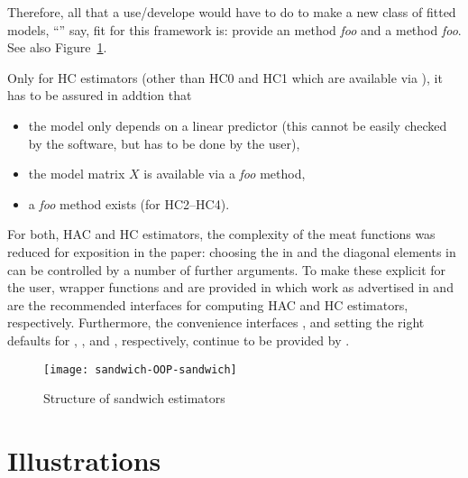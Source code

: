 \documentclass{Z}
\begin{document}
Therefore, all that a use/develope would have to do to make a
new class of fitted models, ``'' say, fit for this framework is: 
provide an  method \emph{foo}\code{()}
and a  method \emph{foo}\code{()}. See also Figure~\ref{fig:sandwich}.

Only for HC estimators (other than HC0 and HC1 which are available via ),
it has to be assured in addtion that 
\begin{itemize}
  \item the model only depends on a linear predictor (this cannot be easily
        checked by the software, but has to be done by the user),
  \item the model matrix $X$ is available via a \emph{foo}\code{()} method,
  \item a \emph{foo}\code{()} method exists (for HC2--HC4).
\end{itemize}

For both, HAC and HC estimators, the complexity of the meat functions was reduced for
exposition in the paper: choosing the  in  and the diagonal elements
 in  can be controlled by a number of further arguments. To make
these explicit for the user, wrapper functions  and  are provided
in  which work as advertised in \cite{hac:Zeileis:2004a} and are the recommended
interfaces for computing HAC and HC estimators, respectively. Furthermore, the convenience
interfaces ,  and  setting the right defaults for
\citep{hac:Andrews:1991}, \cite{hac:Newey+West:1994}, and \cite{hac:Lumley+Heagerty:1999}, respectively,
continue to be provided by .

\begin{figure}[tbh]
\begin{center}
\texttt{[image: sandwich-OOP-sandwich]}
\caption{\label{fig:sandwich} Structure of sandwich estimators}
\end{center}
\end{figure}

\section{Illustrations} \label{sec:illustrations}

\end{document}
